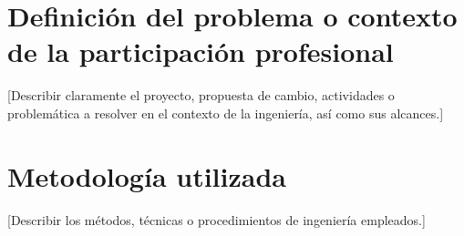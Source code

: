 \documentclass[12pt]{caltech_thesis}
\begin{document}



\chapter{Definición del problema o contexto de la participación profesional}

[Describir claramente el proyecto, propuesta de cambio, actividades o problemática a resolver en el contexto de la ingeniería, así como sus alcances.]




\chapter{Metodología utilizada}

[Describir los métodos, técnicas o procedimientos de ingeniería empleados.]

\end{document}
